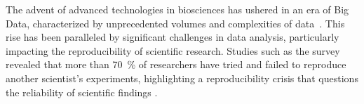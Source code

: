 



%
\label{sec:nontransparencies}%
The advent of advanced technologies in biosciences has ushered in an era of Big
Data, characterized by unprecedented volumes and complexities of
data~\cite{bubendorfHighthroughputMicroarrayTechnologies2001, yangScalabilityValidationBig2017,
    ekmekciIntroductionProgrammingBioscientists2016}. This rise has been paralleled
by significant challenges in data analysis, particularly impacting the
reproducibility of scientific research. Studies such as the
\citet{baker500ScientistsLift2016} survey revealed that more than
\SI{70}{\percent} of researchers have tried and failed to reproduce another
scientist's experiments, highlighting a reproducibility crisis that questions
the reliability of scientific findings
\cite{begleyReproducibilityScienceImproving2015, ioannidisWhyMostPublished2005}.


